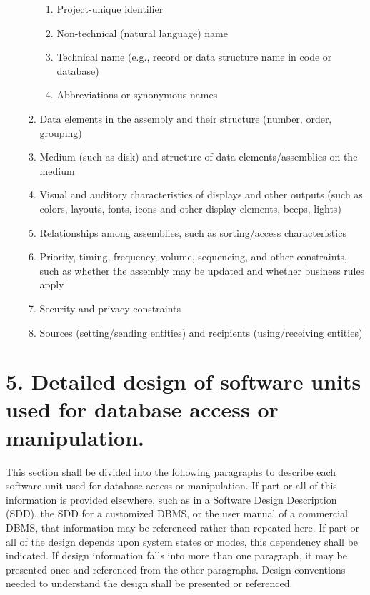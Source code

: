 \begin{enumerate}
\begin{enumerate}
    \begin{enumerate}
    \itemsep1pt\parskip0pt
    \item
      Project-unique identifier
    \item
      Non-technical (natural language) name
    \item
      Technical name (e.g., record or data structure name in code or
      database)
    \item
      Abbreviations or synonymous names
    \end{enumerate}
  \item
    Data elements in the assembly and their structure (number, order,
    grouping)
  \item
    Medium (such as disk) and structure of data elements/assemblies on
    the medium
  \item
    Visual and auditory characteristics of displays and other outputs
    (such as colors, layouts, fonts, icons and other display elements,
    beeps, lights)
  \item
    Relationships among assemblies, such as sorting/access
    characteristics
  \item
    Priority, timing, frequency, volume, sequencing, and other
    constraints, such as whether the assembly may be updated and whether
    business rules apply
  \item
    Security and privacy constraints
  \item
    Sources (setting/sending entities) and recipients (using/receiving
    entities)
  \end{enumerate}
\end{enumerate}

\section{5. Detailed design of software units used for database access
or manipulation.}

This section shall be divided into the following paragraphs to describe
each software unit used for database access or manipulation. If part or
all of this information is provided elsewhere, such as in a Software
Design Description (SDD), the SDD for a customized DBMS, or the user
manual of a commercial DBMS, that information may be referenced rather
than repeated here. If part or all of the design depends upon system
states or modes, this dependency shall be indicated. If design
information falls into more than one paragraph, it may be presented once
and referenced from the other paragraphs. Design conventions needed to
understand the design shall be presented or referenced.

